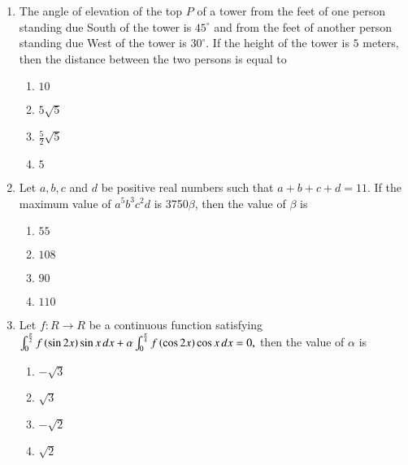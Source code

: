 \documentclass[journal,9pt,onecolumn]{IEEEtran}
\begin{document}
\begin{enumerate}


\item The angle of elevation of the top $P$ of a tower from the feet of one person standing due South of the tower is $45^\circ$ and from the feet of another person standing due West of the tower is $30^\circ$. If the height of the tower is $5$ meters, then the distance  between the two persons is equal to
\begin{multicols}{4}
\begin{enumerate}
    \item $10$
    \item $5 \sqrt{5}$
    \item $\frac{5}{2}\sqrt{5}$
    \item $5$
\end{enumerate}
\end{multicols}

\item Let $a, b, c$ and $d$ be positive real numbers such that $a + b + c + d = 11$. If the maximum value of $a^5 b^3 c^2 d$ is 3750$\beta$, then the value of $\beta$ is 
\begin{multicols}{4}
\begin{enumerate}
    \item $55$
    \item $108$
    \item $90$
    \item $110$
\end{enumerate}
\end{multicols}



\item Let $f: R \to R$ be a continuous function satisfying $\int_0^{\frac{\pi}{2}} f\left(\sin 2x\right) \sin x \, dx + \alpha\int_0^{\frac{\pi}{4}} f\left(\cos 2x\right) \cos x \, dx = 0,$ then the value of $\alpha$ is 
\begin{multicols}{4}
\begin{enumerate}
    \item $-\sqrt{3}$ 
    \item $\sqrt{3}$ 
    \item $-\sqrt{2}$ 
    \item $\sqrt{2}$ 
\end{enumerate}
\end{multicols}




\end{enumerate}
\end{document}
